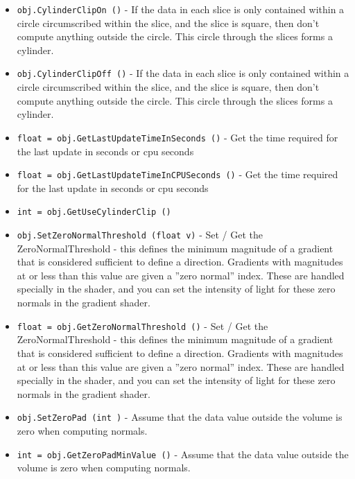 \begin{itemize}
\item  \verb|obj.CylinderClipOn ()| -  If the data in each slice is only contained within a circle circumscribed
 within the slice, and the slice is square, then don't compute anything
 outside the circle. This circle through the slices forms a cylinder.

\item  \verb|obj.CylinderClipOff ()| -  If the data in each slice is only contained within a circle circumscribed
 within the slice, and the slice is square, then don't compute anything
 outside the circle. This circle through the slices forms a cylinder.

\item  \verb|float = obj.GetLastUpdateTimeInSeconds ()| -  Get the time required for the last update in seconds or cpu seconds

\item  \verb|float = obj.GetLastUpdateTimeInCPUSeconds ()| -  Get the time required for the last update in seconds or cpu seconds

\item  \verb|int = obj.GetUseCylinderClip ()|

\item  \verb|obj.SetZeroNormalThreshold (float v)| -  Set / Get the ZeroNormalThreshold - this defines the minimum magnitude 
 of a gradient that is considered sufficient to define a 
 direction. Gradients with magnitudes at or less than this value are given
 a ''zero normal'' index. These are handled specially in the shader, 
 and you can set the intensity of light for these zero normals in
 the gradient shader.

\item  \verb|float = obj.GetZeroNormalThreshold ()| -  Set / Get the ZeroNormalThreshold - this defines the minimum magnitude 
 of a gradient that is considered sufficient to define a 
 direction. Gradients with magnitudes at or less than this value are given
 a ''zero normal'' index. These are handled specially in the shader, 
 and you can set the intensity of light for these zero normals in
 the gradient shader.

\item  \verb|obj.SetZeroPad (int )| -  Assume that the data value outside the volume is zero when
 computing normals.

\item  \verb|int = obj.GetZeroPadMinValue ()| -  Assume that the data value outside the volume is zero when
 computing normals.


\end{itemize}
